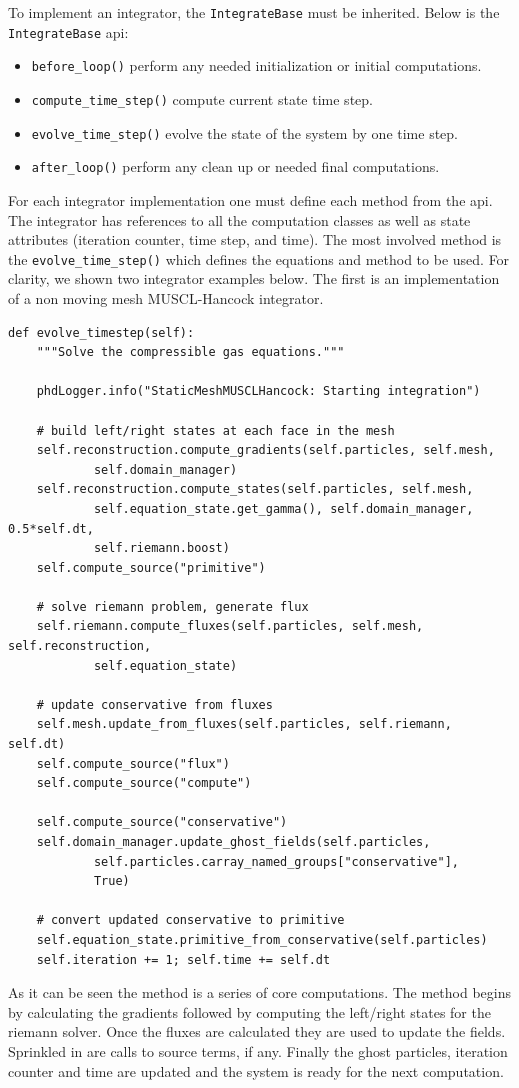 To implement an integrator, the \lstinline{IntegrateBase} must be inherited. Below
is the \lstinline{IntegrateBase} api:
\begin{itemize}
    \item \lstinline{before_loop()} perform any needed initialization or initial computations. 
    \item \lstinline{compute_time_step()} compute current state time step.
    \item \lstinline{evolve_time_step()} evolve the state of the system by one time step.
    \item \lstinline{after_loop()} perform any clean up or needed final computations.
\end{itemize}
For each integrator implementation one must define each method from the api. The integrator
has references to all the computation classes as well as state attributes (iteration
counter, time step, and time). The most
involved method is the \lstinline{evolve_time_step()} which defines the equations
and method to be used. For clarity, we shown two integrator examples below. The first
is an implementation of a non moving mesh MUSCL-Hancock integrator.
\begin{lstlisting}
def evolve_timestep(self):
    """Solve the compressible gas equations."""

    phdLogger.info("StaticMeshMUSCLHancock: Starting integration")

    # build left/right states at each face in the mesh
    self.reconstruction.compute_gradients(self.particles, self.mesh,
            self.domain_manager)
    self.reconstruction.compute_states(self.particles, self.mesh,
            self.equation_state.get_gamma(), self.domain_manager, 0.5*self.dt,
            self.riemann.boost)
    self.compute_source("primitive")

    # solve riemann problem, generate flux
    self.riemann.compute_fluxes(self.particles, self.mesh, self.reconstruction,
            self.equation_state)

    # update conservative from fluxes
    self.mesh.update_from_fluxes(self.particles, self.riemann, self.dt)
    self.compute_source("flux")
    self.compute_source("compute")

    self.compute_source("conservative")
    self.domain_manager.update_ghost_fields(self.particles,
            self.particles.carray_named_groups["conservative"],
            True)

    # convert updated conservative to primitive
    self.equation_state.primitive_from_conservative(self.particles)
    self.iteration += 1; self.time += self.dt
\end{lstlisting}
As it can be seen the method is a series of core computations. The method
begins by calculating the gradients followed by computing the left/right
states for the riemann solver. Once the fluxes are calculated they are used
to update the fields. Sprinkled in are calls to source terms, if any.
Finally the ghost particles, iteration counter and
time are updated and the system is ready for the next computation.

